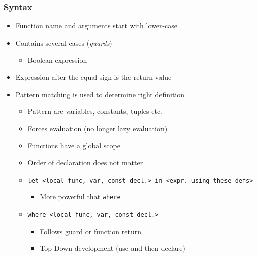 \subsubsection{Syntax}
\begin{itemize}
        \begin{itemize}
            \item Function name and arguments start with lower-case
            \item Contains several cases (\textit{guards})
                \begin{itemize}
                    \item Boolean expression
                \end{itemize}
            \item Expression after the equal sign is the return value
            \item Pattern matching is used to determine right definition
                \begin{itemize}
                    \item Pattern are variables, constants, tuples etc.
                    \item Forces evaluation (no longer lazy evaluation)
                \end{itemize}
                \begin{itemize}
                    \item Functions have a global scope
                    \item Order of declaration does not matter
                    \item \verb+let <local func, var, const decl.> in <expr. using these defs>+
                        \begin{itemize}
                            \item More powerful that \verb+where+
                        \end{itemize}
                    \item \verb+where <local func, var, const decl.>+
                        \begin{itemize}
                            \item Follows guard or function return
                            \item Top-Down development (use and then declare)
                        \end{itemize}
                \end{itemize}

\end{itemize}
\end{itemize}

